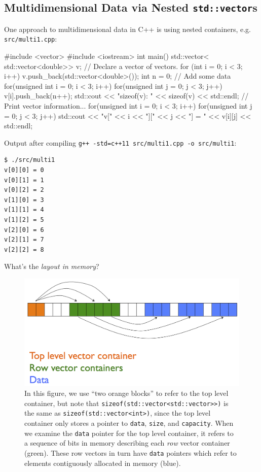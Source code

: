 \documentclass[12pt,letterpaper,twoside]{article}
\begin{document}
\vspace{-2ex}
\subsection{Multidimensional Data via Nested \texttt{std::vector}s}
\label{sec: nested-vectors}
One approach to multidimensional data in C++ is using nested containers, e.g.
\texttt{src/multi1.cpp}:

\begin{cpp}
#include <vector>
#include <iostream>
 int main() {
  std::vector< std::vector<double>> v;                     // Declare a vector of vectors.
  for (int i = 0; i < 3; i++) 
    v.push_back(std::vector<double>());
  int n = 0;                                               // Add some data
  for(unsigned int i = 0; i < 3; i++)
    for(unsigned int j = 0; j < 3; j++)
      v[i].push_back(n++);
  std::cout << "sizeof(v): " << sizeof(v) << std::endl;    // Print vector information...
  for(unsigned int i = 0; i < 3; i++)
    for(unsigned int j = 0; j < 3; j++)
      std::cout << "v[" << i << "][" << j << "] = " << v[i][j] << std::endl;
}
\end{cpp}

Output after compiling
{\small \texttt{g++ -std=c++11 src/multi1.cpp -o src/multi1}}:

{\small
\begin{verbatim}
$ ./src/multi1
v[0][0] = 0
v[0][1] = 1
v[0][2] = 2
v[1][0] = 3
v[1][1] = 4
v[1][2] = 5
v[2][0] = 6
v[2][1] = 7
v[2][2] = 8
\end{verbatim}
}

What's the \emph{layout in memory}?
\begin{figure}[h]
\centering
\includegraphics[scale=0.5]{fig/vector-of-vectors.png}
\caption{\footnotesize 
  In this figure, we use ``two orange blocks'' to refer to the top level container, but note
  that \texttt{sizeof(std::vector<std::vector>>)} is the same as \texttt{sizeof(std::vector<int>)}, 
  since the top level container only stores a pointer to \texttt{data}, \texttt{size}, and 
  \texttt{capacity}. When we examine the \texttt{data} pointer for the top level container, 
  it refers 
  to a sequence of bits in memory describing each \emph{row} vector container (green). 
  These row vectors in 
  turn have \texttt{data} pointers which refer to elements contiguously allocated in memory (blue).}
\label{fig: nested-vectors}
\end{figure}
\end{document}
